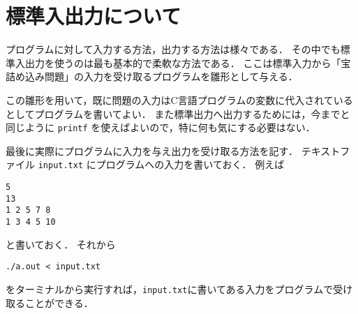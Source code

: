 \documentclass[a4paper,twoside,onecolumn,openany,article]{memoir}
\theoremstyle{remark}
\begin{document}
\section{標準入出力について}
プログラムに対して入力する方法，出力する方法は様々である．
その中でも標準入出力を使うのは最も基本的で柔軟な方法である．
ここは標準入力から「宝詰め込み問題」の入力を受け取るプログラムを雛形として与える．


この雛形を用いて，既に問題の入力はC言語プログラムの変数に代入されているとしてプログラムを書いてよい．
また標準出力へ出力するためには，今までと同じように \texttt{printf} を使えばよいので，特に何も気にする必要はない．

最後に実際にプログラムに入力を与え出力を受け取る方法を記す．
テキストファイル \texttt{input.txt} にプログラムへの入力を書いておく．
例えば
\begin{verbatim}
5
13
1 2 5 7 8
1 3 4 5 10
\end{verbatim}
と書いておく．
それから

\begin{verbatim}
./a.out < input.txt
\end{verbatim}
をターミナルから実行すれば，\texttt{input.txt}に書いてある入力をプログラムで受け取ることができる．
\end{document}
